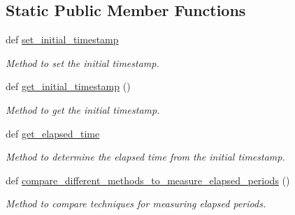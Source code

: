 \subsection*{Static Public Member Functions}
\begin{DoxyCompactItemize}
\item 
def \hyperlink{classutilities_1_1timing__measurements_1_1performance__measurement_1_1execution__time__measurement_aa82fdf41b58ed820066c6f74450a2e66}{set\+\_\+initial\+\_\+timestamp}
\begin{DoxyCompactList}\small\item\em Method to set the initial timestamp. \end{DoxyCompactList}\item 
def \hyperlink{classutilities_1_1timing__measurements_1_1performance__measurement_1_1execution__time__measurement_a8737db6c2fdb833d0d30d80c70ffebb0}{get\+\_\+initial\+\_\+timestamp} ()
\begin{DoxyCompactList}\small\item\em Method to get the initial timestamp. \end{DoxyCompactList}\item 
def \hyperlink{classutilities_1_1timing__measurements_1_1performance__measurement_1_1execution__time__measurement_a02b1d7ffce2b4c702a82a03803322e65}{get\+\_\+elapsed\+\_\+time}
\begin{DoxyCompactList}\small\item\em Method to determine the elapsed time from the initial timestamp. \end{DoxyCompactList}\item 
def \hyperlink{classutilities_1_1timing__measurements_1_1performance__measurement_1_1execution__time__measurement_a9b05f1fd5acd56880daa42266dbf8284}{compare\+\_\+different\+\_\+methods\+\_\+to\+\_\+measure\+\_\+elapsed\+\_\+periods} ()
\begin{DoxyCompactList}\small\item\em Method to compare techniques for measuring elapsed periods. \end{DoxyCompactList}\end{DoxyCompactItemize}
